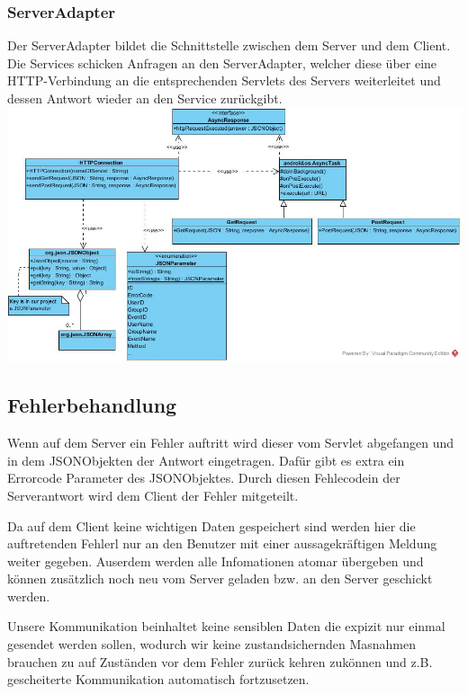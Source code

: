 	\subsubsection{ServerAdapter}
	Der ServerAdapter bildet die Schnittstelle zwischen dem Server und dem Client. Die Services schicken Anfragen an den ServerAdapter, welcher diese über eine HTTP-Verbindung an die entsprechenden Servlets des Servers weiterleitet und dessen Antwort wieder an den Service zurückgibt.
		\newline
		\includegraphics[width=1\textwidth]{HTTPClientClass Diagram.jpg}

	\subsection{Fehlerbehandlung}
Wenn auf dem Server ein Fehler auftritt wird dieser vom Servlet abgefangen und in dem JSONObjekten der Antwort eingetragen. Dafür gibt es extra ein Errorcode Parameter des JSONObjektes. Durch diesen Fehlecodein der Serverantwort wird dem Client der Fehler mitgeteilt.\par

Da auf dem Client keine wichtigen Daten gespeichert sind werden hier die auftretenden Fehlerl nur an den Benutzer mit einer aussagekräftigen Meldung weiter gegeben. Auserdem werden alle Infomationen atomar übergeben und können zusätzlich noch neu vom Server geladen bzw. an den Server geschickt werden. \par

Unsere Kommunikation beinhaltet keine sensiblen Daten die expizit nur einmal gesendet werden sollen, wodurch wir keine zustandsichernden Masnahmen brauchen zu auf Zuständen vor dem Fehler zurück kehren zukönnen und z.B. gescheiterte Kommunikation automatisch fortzusetzen.
	



		


	\newpage
